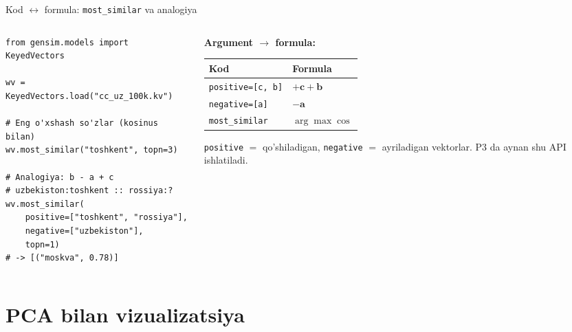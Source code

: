 \documentclass[aspectratio=169,11pt]{beamer}
\begin{document}
\begin{frame}[fragile]{Kod $\leftrightarrow$ formula: \texttt{most\_similar} va analogiya}
  \begin{columns}[T]
    \begin{column}{0.54\textwidth}
\begin{lstlisting}
from gensim.models import KeyedVectors

wv = KeyedVectors.load("cc_uz_100k.kv")

# Eng o'xshash so'zlar (kosinus bilan)
wv.most_similar("toshkent", topn=3)

# Analogiya: b - a + c
# uzbekiston:toshkent :: rossiya:?
wv.most_similar(
    positive=["toshkent", "rossiya"],
    negative=["uzbekiston"],
    topn=1)
# -> [("moskva", 0.78)]
\end{lstlisting}
    \end{column}
    \begin{column}{0.42\textwidth}
      \textbf{Argument $\to$ formula:}\\[4pt]
      \footnotesize
      \begin{tabular}{p{2.3cm}l}
        \toprule
        Kod & Formula \\
        \midrule
        \texttt{positive=[c, b]} & $+\mathbf{c}+\mathbf{b}$ \\
        \texttt{negative=[a]} & $-\mathbf{a}$ \\
        \texttt{most\_similar} & $\arg\max \cos$ \\
        \bottomrule
      \end{tabular}
      \vspace{4pt}
      \begin{tcolorbox}[warnbox,title=Eslatma,top=2pt,bottom=2pt]
        \footnotesize
        \texttt{positive} $=$ qo'shiladigan,
        \texttt{negative} $=$ ayriladigan vektorlar.
        P3 da aynan shu API ishlatiladi.
      \end{tcolorbox}
    \end{column}
  \end{columns}
\end{frame}

\section[Vizualizatsiya]{PCA bilan vizualizatsiya}
\end{document}

